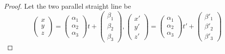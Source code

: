 \documentclass[a4paper,11pt]{article}
\begin{document}
\section{}
\begin{proof}
Let the two parallel straight line be
\[ \begin{pmatrix} x \\ y \\ z \end{pmatrix} = \begin{pmatrix} \alpha_1 \\ \alpha_2 \\ \alpha_3 \end{pmatrix} t + \begin{pmatrix} \beta_1 \\ \beta_2 \\ \beta_3 \end{pmatrix} 
, \begin{pmatrix} x' \\ y' \\ z' \end{pmatrix} = \begin{pmatrix} \alpha_1 \\ \alpha_2 \\ \alpha_3 \end{pmatrix} t' + \begin{pmatrix} \beta'_1 \\ \beta'_2 \\ \beta'_3 \end{pmatrix} 
\]


\end{proof}
\end{document}
